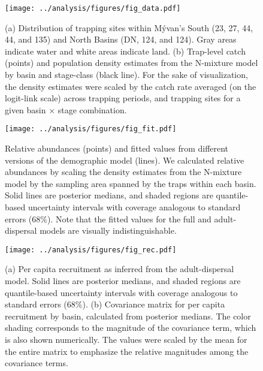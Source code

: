 \documentclass[11pt]{article}
\begin{document}
\clearpage
\begin{figure}
\centering
\texttt{[image: ../analysis/figures/fig\_data.pdf]}
\caption{\label{fig:data}
(a) Distribution of trapping sites within M\'{y}van's
South (23, 27, 44, 44, and 135) and North Basins (DN, 124, and 124). 
Gray areas indicate water and white areas indicate land.
(b) Trap-level catch (points) and 
population density estimates from the N-mixture model by basin and stage-class (black line).
For the sake of visualization, the density estimates were scaled 
by the catch rate averaged (on the logit-link scale) across trapping periods,
and trapping sites for a given basin $\times$ stage combination.
}
\end{figure}
\clearpage

\clearpage
\begin{figure}
\centering
\texttt{[image: ../analysis/figures/fig\_fit.pdf]}
\caption{\label{fig:fit}
Relative abundances (points) and fitted values from different versions 
of the demographic model (lines).
We calculated relative abundances by scaling the density estimates from the 
N-mixture model by the sampling area spanned by the traps within each basin. 
Solid lines are posterior medians,
and shaded regions are quantile-based uncertainty intervals
with coverage analogous to standard errors (68\%).
Note that the fitted values for the full and adult-dispersal models 
are visually indistinguishable.
}
\end{figure}
\clearpage

\clearpage
\begin{figure}
\centering
\texttt{[image: ../analysis/figures/fig\_rec.pdf]}
\caption{\label{fig:rec}
(a) Per capita recruitment as inferred from the adult-dispersal model.
Solid lines are posterior medians,
and shaded regions are quantile-based uncertainty intervals
with coverage analogous to standard errors (68\%).
(b) Covariance matrix for per capita recruitment by basin,
calculated from posterior medians.
The color shading corresponds to the magnitude of the covariance term,
which is also shown numerically. 
The values were scaled by the mean for the entire matrix to emphasize 
the relative magnitudes among the covariance terms.
}
\end{figure}
\clearpage
\end{document}
